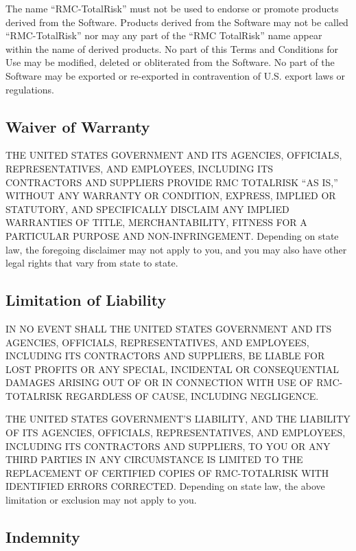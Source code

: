\documentclass[
]{book}
\begin{document}
The name ``RMC-TotalRisk'' must not be used to endorse or promote products derived from the Software. Products derived from the Software may not be called ``RMC-TotalRisk'' nor may any part of the ``RMC TotalRisk'' name appear within the name of derived products. No part of this Terms and Conditions for Use may be modified, deleted or obliterated from the Software. No part of the Software may be exported or re-exported in contravention of U.S. export laws or regulations.

\hypertarget{waiver-of-warranty}{%
\subsection{Waiver of Warranty}\label{waiver-of-warranty}}

THE UNITED STATES GOVERNMENT AND ITS AGENCIES, OFFICIALS, REPRESENTATIVES, AND EMPLOYEES, INCLUDING ITS CONTRACTORS AND SUPPLIERS PROVIDE RMC TOTALRISK ``AS IS,'' WITHOUT ANY WARRANTY OR CONDITION, EXPRESS, IMPLIED OR STATUTORY, AND SPECIFICALLY DISCLAIM ANY IMPLIED WARRANTIES OF TITLE, MERCHANTABILITY, FITNESS FOR A PARTICULAR PURPOSE AND NON-INFRINGEMENT. Depending on state law, the foregoing disclaimer may not apply to you, and you may also have other legal rights that vary from state to state.

\hypertarget{limitation-of-liability}{%
\subsection{Limitation of Liability}\label{limitation-of-liability}}

IN NO EVENT SHALL THE UNITED STATES GOVERNMENT AND ITS AGENCIES, OFFICIALS, REPRESENTATIVES, AND EMPLOYEES, INCLUDING ITS CONTRACTORS AND SUPPLIERS, BE LIABLE FOR LOST PROFITS OR ANY SPECIAL, INCIDENTAL OR CONSEQUENTIAL DAMAGES ARISING OUT OF OR IN CONNECTION WITH USE OF RMC-TOTALRISK REGARDLESS OF CAUSE, INCLUDING NEGLIGENCE.

THE UNITED STATES GOVERNMENT'S LIABILITY, AND THE LIABILITY OF ITS AGENCIES, OFFICIALS, REPRESENTATIVES, AND EMPLOYEES, INCLUDING ITS CONTRACTORS AND SUPPLIERS, TO YOU OR ANY THIRD PARTIES IN ANY CIRCUMSTANCE IS LIMITED TO THE REPLACEMENT OF CERTIFIED COPIES OF RMC-TOTALRISK WITH IDENTIFIED ERRORS CORRECTED. Depending on state law, the above limitation or exclusion may not apply to you.

\hypertarget{indemnity}{%
\subsection{Indemnity}\label{indemnity}}
\end{document}
